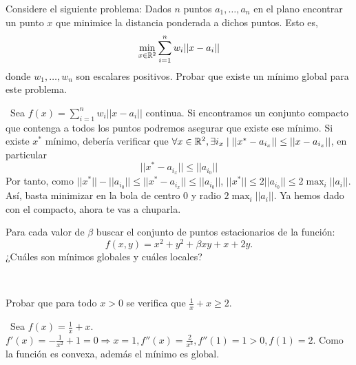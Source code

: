 \documentclass[twoside]{article}
\begin{document}
\newpage 

\begin{ejercicio}{4}
Considere el siguiente problema:
Dados $n$ puntos $a_1,\dots,a_n$ en el plano encontrar un punto $x$ que minimice la distancia ponderada a dichos puntos. Esto es,
$$\min_{x\in\mathbb{R}^2}\sum_{i=1}^nw_i||x-a_i||$$
donde $w_1,\dots,w_n$ son escalares positivos. Probar que existe un mínimo global para este problema. 
\begin{solucion}\
Sea $f(x)=\sum_{i=1}^nw_i||x-a_i||$ continua. Si encontramos un conjunto compacto que contenga a todos los puntos podremos asegurar que existe ese mínimo. Si existe $x^*$ mínimo, debería verificar que $\forall x\in\mathbb{R}^2, \exists i_x\mid ||x^*-a_{i_x}||\leq ||x-a_{i_x}||$, en particular $$||x^*-a_{i_x}||\leq ||a_{i_0}||$$
Por tanto, como $||x^*||-||a_{i_0}||\leq ||x^*-a_{i_x}||\leq ||a_{i_0}||$, $||x^*||\leq 2||a_{i_0}||\leq 2\max_i{||a_i||}$. Así, basta minimizar en la bola de centro 0 y radio $2\max_i{||a_i||}$. Ya hemos dado con el compacto, ahora te vas a chuparla.
\end{solucion}
\end{ejercicio}

\newpage 

\begin{ejercicio}{5}

Para cada valor de $\beta$ buscar el conjunto de puntos estacionarios de la función: $$f(x,y)=x^2+y^2+\beta xy+x+2y.$$
¿Cuáles son mínimos globales y cuáles locales?
\begin{solucion}\
\end{solucion}
\end{ejercicio}

\newpage 

\begin{ejercicio}{6}
Probar que para todo $x>0$ se verifica que $\frac{1}{x}+x\geq 2$.

\begin{solucion}\
Sea $f(x)=\frac{1}{x}+x$. $f'(x)=-\frac{1}{x^2}+1=0\Rightarrow x=1, f''(x)=\frac{2}{x^3},f''(1)=1>0, f(1)=2$. Como la función es convexa, además el mínimo es global.
\end{solucion}
\end{ejercicio}

\newpage 
\end{document}
